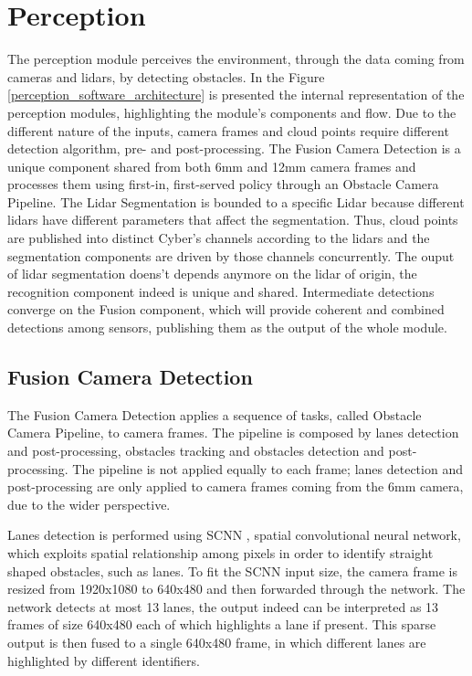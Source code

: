 \documentclass[conference]{IEEEtran}
\begin{document}
\section{Perception}
The perception module perceives the environment, through the data coming from cameras and lidars, by detecting obstacles.
In the Figure \ref{perception_software_architecture} is presented the internal representation of the perception modules, highlighting the module's components and flow.
Due to the different nature of the inputs, camera frames and cloud points require different detection algorithm, pre- and post-processing.
The Fusion Camera Detection is a unique component shared from both 6mm and 12mm camera frames and processes them using first-in, first-served policy through an Obstacle Camera Pipeline.
The Lidar Segmentation is bounded to a specific Lidar because different lidars have different parameters that affect the segmentation.
Thus, cloud points are published into distinct Cyber's channels according to the lidars and the segmentation components are driven by those channels concurrently.
The ouput of lidar segmentation doens't depends anymore on the lidar of origin, the recognition component indeed is unique and shared.
Intermediate detections converge on the Fusion component, which will provide coherent and combined detections among sensors, publishing them as the output of the whole module.

\subsection{Fusion Camera Detection}

The Fusion Camera Detection applies a sequence of tasks, called Obstacle Camera Pipeline, to camera frames.
The pipeline is composed by lanes detection and post-processing, obstacles tracking and obstacles detection and post-processing.
The pipeline is not applied equally to each frame; lanes detection and post-processing are only applied to camera frames coming from the 6mm camera, due to the wider perspective.

Lanes detection is performed using SCNN \cite{b2}, spatial convolutional neural network, which exploits spatial relationship among pixels in order to identify straight shaped obstacles, such as lanes.
To fit the SCNN input size, the camera frame is resized from 1920x1080 to 640x480 and then forwarded through the network.
The network detects at most 13 lanes, the output indeed can be interpreted as 13 frames of size 640x480 each of which highlights a lane if present. 
This sparse output is then fused to a single 640x480 frame, in which different lanes are highlighted by different identifiers.
\end{document}
